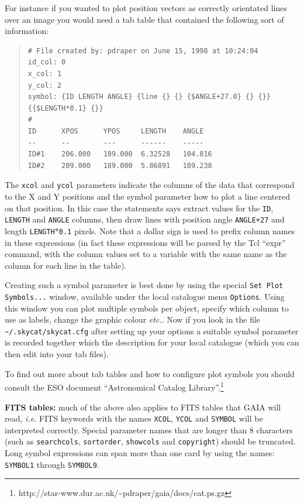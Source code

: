 \documentclass[twoside,11pt]{article}
\newcommand{\htmladdnormallinkfoot}[2]{#1\footnote{#2}}
\renewcommand{\_}{\texttt{\symbol{95}}}
\newcommand{\mytt}[1]{{\tt{#1}}}
\begin{document}
For instance if you wanted to plot position vectors as correctly
orientated lines over an image you would need a tab table that
contained the following sort of information:
\begin{quote}
\begin{verbatim}
# File created by: pdraper on June 15, 1998 at 10:24:04
id_col: 0
x_col: 1
y_col: 2
symbol: {ID LENGTH ANGLE} {line {} {} {$ANGLE+27.0} {} {}} {{$LENGTH*0.1} {}}
#
ID      XPOS      YPOS     LENGTH    ANGLE
--      --        ---      ------    -----
ID#1    206.000   189.000  6.32528   104.816
ID#2    209.000   189.000  5.86891   109.238
\end{verbatim}
\end{quote}
The \mytt{x\_col} and \mytt{y\_col} parameters indicate the columns of
the data that correspond to the X and Y positions and the symbol
parameter how to plot a line centered on that position. In this case
the statements says extract values for the \mytt{ID}, \mytt{LENGTH}
and \mytt{ANGLE} columns, then draw lines with position angle
\mytt{ANGLE+27} and length \mytt{LENGTH$*$0.1} pixels. Note that a
dollar sign is used to prefix column names in these expressions (in
fact these expressions will be parsed by the Tcl ``expr'' command,
with the column values set to a variable with the same name as the
column for each line in the table).

Creating such a symbol parameter is best done by using the special
\mytt{Set Plot Symbols...} window, available under the local catalogue
menu \mytt{Options}. Using this window you can plot multiple symbols per
object, specify which column to use as labels, change the graphic
colour {\em etc.}. Now if you look in the file
\mytt{\~{}/.skycat/skycat.cfg} after setting up your options a suitable
symbol parameter is recorded together which the description for your
local catalogue (which you can then edit into your tab files).

To find out more about tab tables and how to configure plot symbols
you should consult the ESO document
\htmladdnormallinkfoot{``Astronomical Catalog Library''.}
{http://star-www.dur.ac.uk/\~{}pdraper/gaia/docs/cat.ps.gz}

\textbf{FITS tables:} much of the above also applies to FITS tables
that GAIA will read, {\em i.e.} FITS keywords with the names \mytt{X\_COL},
\mytt{Y\_COL} and \mytt{SYMBOL} will be interpreted
correctly. Special parameter names that are longer than 8 characters
(such as \mytt{search\_cols}, \mytt{sort\_order}, \mytt{show\_cols}
and \mytt{copyright}) should be truncated. Long symbol expressions can
span more than one card by using the names: \mytt{SYMBOL1} through
\mytt{SYMBOL9}.
\end{document}
